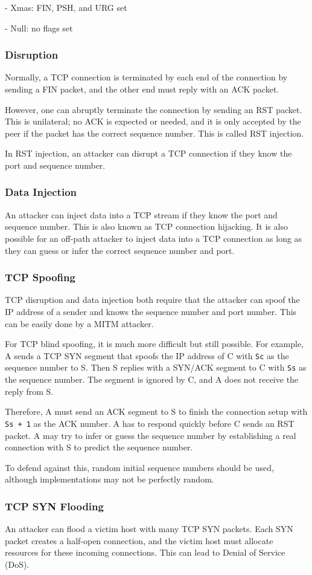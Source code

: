 - Xmas: FIN, PSH, and URG set  

- Null: no flags set  

\subsubsection{Disruption}
Normally, a TCP connection is terminated by each end of the connection by sending a FIN packet, and the other end must reply with an ACK packet.  

However, one can abruptly terminate the connection by sending an RST packet. This is unilateral; no ACK is expected or needed, and it is only accepted by the peer if the packet has the correct sequence number. This is called RST injection.  

In RST injection, an attacker can disrupt a TCP connection if they know the port and sequence number.  

\subsubsection{Data Injection}
An attacker can inject data into a TCP stream if they know the port and sequence number. This is also known as TCP connection hijacking. It is also possible for an off-path attacker to inject data into a TCP connection as long as they can guess or infer the correct sequence number and port.  

\subsubsection{TCP Spoofing}
TCP disruption and data injection both require that the attacker can spoof the IP address of a sender and knows the sequence number and port number. This can be easily done by a MITM attacker.  

For TCP blind spoofing, it is much more difficult but still possible. For example, A sends a TCP SYN segment that spoofs the IP address of C with \texttt{Sc} as the sequence number to S. Then S replies with a SYN/ACK segment to C with \texttt{Ss} as the sequence number. The segment is ignored by C, and A does not receive the reply from S.  

Therefore, A must send an ACK segment to S to finish the connection setup with \texttt{Ss + 1} as the ACK number. A has to respond quickly before C sends an RST packet. A may try to infer or guess the sequence number by establishing a real connection with S to predict the sequence number.  

To defend against this, random initial sequence numbers should be used, although implementations may not be perfectly random.  

\subsubsection{TCP SYN Flooding}
An attacker can flood a victim host with many TCP SYN packets. Each SYN packet creates a half-open connection, and the victim host must allocate resources for these incoming connections. This can lead to Denial of Service (DoS).